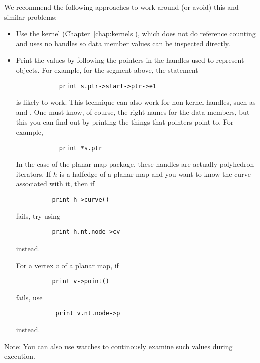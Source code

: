 We recommend the following approaches to work around (or avoid) this 
and similar problems:
\begin{itemize}
   \item Use the  kernel 
         (Chapter~\ref{chap:kernels}), which does not do reference
         counting and uses no handles so data member values can be inspected
         directly.
   \item Print the values by following the pointers in the handles used to 
         represent objects.  For example, for the segment above, the statement
         \begin{verbatim}
            print s.ptr->start->ptr->e1
         \end{verbatim}
         is likely to work.  This technique can also work for non-kernel 
         handles, such as  and .
         One must know, of course, the right names for the data members,
         but this you can find out by printing the things that pointers
         point to.   For example,
         \begin{verbatim}
            print *s.ptr
         \end{verbatim}
         In the case of the planar map package, these handles are actually 
         polyhedron iterators. 
         If $h$ is a halfedge of a planar map and you want to know the curve 
         associated with it, then if
         \begin{verbatim}
          print h->curve()
         \end{verbatim}
         fails, try using 
         \begin{verbatim}
          print h.nt.node->cv
         \end{verbatim}
         instead.

         For a vertex $v$ of a planar map, if 
         \begin{verbatim}
          print v->point()
         \end{verbatim}
         fails, use  
         \begin{verbatim}
           print v.nt.node->p
         \end{verbatim}
         instead.
\end{itemize}

Note: You can also use watches to continously examine such values during 
execution.

